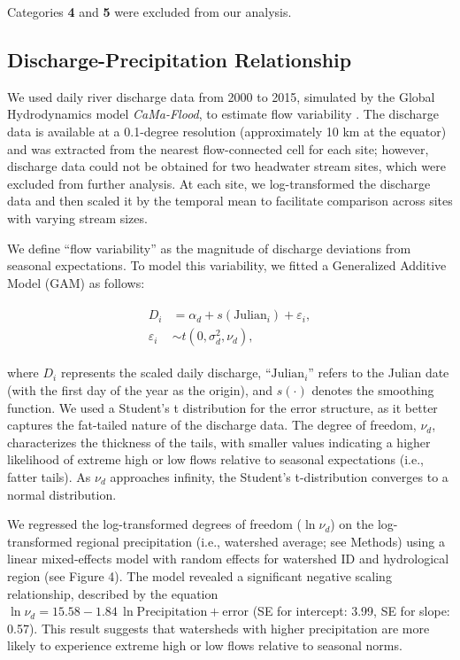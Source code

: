 \documentclass[11pt, class=article, crop=false]{standalone}
\theoremstyle{definition}
\begin{document}
Categories \textbf{4} and \textbf{5} were excluded from our analysis.

\vspace{0.5cm} 

\vspace{0.5cm} 

\subsection{Discharge-Precipitation Relationship}
We used daily river discharge data from 2000 to 2015, simulated by the Global Hydrodynamics model \textit{CaMa-Flood}, to estimate flow variability  \cite{yamazaki_deriving_2009, kimura_methodology_2023, lin_global_2019}.
The discharge data is available at a 0.1-degree resolution (approximately 10 km at the equator) and was extracted from the nearest flow-connected cell for each site; however, discharge data could not be obtained for two headwater stream sites, which were excluded from further analysis.
At each site, we log-transformed the discharge data and then scaled it by the temporal mean to facilitate comparison across sites with varying stream sizes.

We define ``flow variability'' as the magnitude of discharge deviations from seasonal expectations.
To model this variability, we fitted a Generalized Additive Model (GAM) as follows:

\begin{align}
    \begin{split}
    D_i &= \alpha_d + s(\mathrm{Julian}_i) + \varepsilon_i,\\
    \varepsilon_i &\sim t(0, \sigma_d^2, \nu_d),
    \end{split}
\end{align}

where $D_i$ represents the scaled daily discharge, ``$\mathrm{Julian}_i$'' refers to the Julian date (with the first day of the year as the origin), and $s(\cdot)$ denotes the smoothing function.
We used a Student's t distribution for the error structure, as it better captures the fat-tailed nature of the discharge data.
The degree of freedom, $\nu_d$, characterizes the thickness of the tails, with smaller values indicating a higher likelihood of extreme high or low flows relative to seasonal expectations (i.e., fatter tails).
As $\nu_d$ approaches infinity, the Student's t-distribution converges to a normal distribution.

We regressed the log-transformed degrees of freedom ($\ln \nu_d$) on the log-transformed regional precipitation (i.e., watershed average; see Methods) using a linear mixed-effects model with random effects for watershed ID and hydrological region (see Figure 4).
The model revealed a significant negative scaling relationship, described by the equation $\ln \nu_d = 15.58 - 1.84 \, \ln \text{Precipitation} + \text{error}$ (SE for intercept: 3.99, SE for slope: 0.57).
This result suggests that watersheds with higher precipitation are more likely to experience extreme high or low flows relative to seasonal norms.
\end{document}
